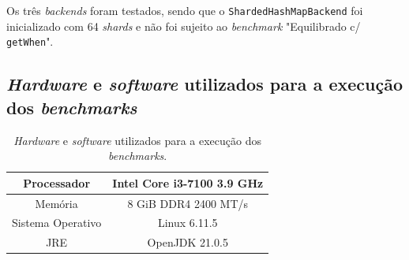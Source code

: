 \documentclass[11pt, a4paper]{article}
\begin{document}
Os três \emph{backends} foram testados, sendo que o \texttt{ShardedHashMapBackend} foi inicializado
com 64 \emph{shards} e não foi sujeito ao \emph{benchmark} "Equilibrado c/ \texttt{getWhen}"{}.

\subsection{\emph{Hardware} e \emph{software} utilizados para a execução dos \emph{benchmarks}}
\label{hardware-software-description}

\begin{table}[H]
    \begin{center}
        \begin{tabular}{|c|c|}
            \hline Processador       & Intel Core i3-7100 3.9 GHz  \\
            \hline Memória           & 8 GiB DDR4 2400 MT/s        \\
            \hline Sistema Operativo & Linux 6.11.5                \\
            \hline JRE               & OpenJDK 21.0.5              \\
            \hline
        \end{tabular}
    \end{center}

    \caption{\emph{Hardware} e \emph{software} utilizados para a execução dos \emph{benchmarks}.}
    \label{hardware-software}
\end{table}
\end{document}
